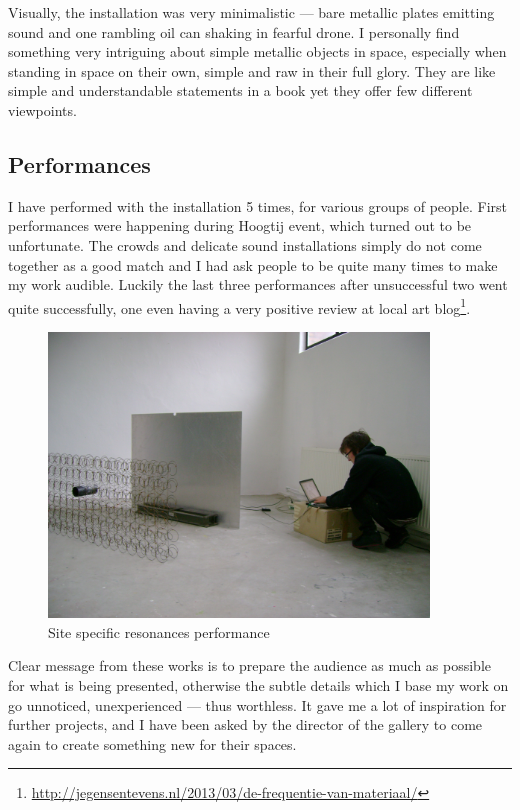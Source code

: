 \documentclass[12pt,a4paper,oneside]{report}
\begin{document}
Visually, the installation was very minimalistic --- bare metallic plates emitting sound and one rambling oil can shaking in fearful drone. I personally find something very intriguing about simple metallic objects in space, especially when standing in space on their own, simple and raw in their full glory. They are like simple and understandable statements in a book yet they offer few different viewpoints.

\subsection{Performances}

I have performed with the installation 5 times, for various groups of people. First performances were happening during Hoogtij event, which turned out to be unfortunate. The crowds and delicate sound installations simply do not come together as a good match and I had ask people to be quite many times to make my work audible. Luckily the last three performances after unsuccessful two went quite successfully, one even having a very positive review at local art blog\footnote{\url{http://jegensentevens.nl/2013/03/de-frequentie-van-materiaal/}}.

\begin{figure}  
  \centering
    \includegraphics[width=0.9\textwidth]{img/sitespec}
	\caption{Site specific resonances performance}
	\label{fig:sitespec}
\end{figure}

Clear message from these works is to prepare the audience as much as possible for what is being presented, otherwise the subtle details which I base my work on go unnoticed, unexperienced --- thus worthless. It gave me a lot of inspiration for further projects, and I have been asked by the director of the gallery to come again to create something new for their spaces.
\end{document}

